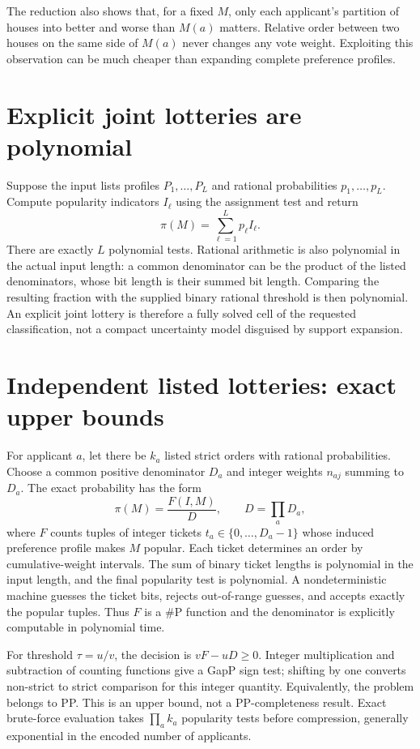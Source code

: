 \documentclass[11pt]{article}
\begin{document}
The reduction also shows that, for a fixed $M$, only each applicant's partition of houses into better and worse than $M(a)$ matters. Relative order between two houses on the same side of $M(a)$ never changes any vote weight. Exploiting this observation can be much cheaper than expanding complete preference profiles.

\section*{Explicit joint lotteries are polynomial}
Suppose the input lists profiles $P_1,\ldots,P_L$ and rational probabilities $p_1,\ldots,p_L$. Compute popularity indicators $I_\ell$ using the assignment test and return
\[
 \pi(M)=\sum_{\ell=1}^Lp_\ell I_\ell.
\]
There are exactly $L$ polynomial tests. Rational arithmetic is also polynomial in the actual input length: a common denominator can be the product of the listed denominators, whose bit length is their summed bit length. Comparing the resulting fraction with the supplied binary rational threshold is then polynomial. An explicit joint lottery is therefore a fully solved cell of the requested classification, not a compact uncertainty model disguised by support expansion.

\section*{Independent listed lotteries: exact upper bounds}
For applicant $a$, let there be $k_a$ listed strict orders with rational probabilities. Choose a common positive denominator $D_a$ and integer weights $n_{aj}$ summing to $D_a$. The exact probability has the form
\[
 \pi(M)=\frac{F(I,M)}{D},\qquad D=\prod_aD_a,
\]
where $F$ counts tuples of integer tickets $t_a\in\{0,\ldots,D_a-1\}$ whose induced preference profile makes $M$ popular. Each ticket determines an order by cumulative-weight intervals. The sum of binary ticket lengths is polynomial in the input length, and the final popularity test is polynomial. A nondeterministic machine guesses the ticket bits, rejects out-of-range guesses, and accepts exactly the popular tuples. Thus $F$ is a \#P function and the denominator is explicitly computable in polynomial time.

For threshold $\tau=u/v$, the decision is $vF-uD\geq0$. Integer multiplication and subtraction of counting functions give a GapP sign test; shifting by one converts non-strict to strict comparison for this integer quantity. Equivalently, the problem belongs to PP. This is an upper bound, not a PP-completeness result. Exact brute-force evaluation takes $\prod_ak_a$ popularity tests before compression, generally exponential in the encoded number of applicants.
\end{document}
